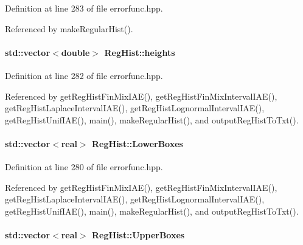 \-Definition at line 283 of file errorfunc.\-hpp.



\-Referenced by make\-Regular\-Hist().

\hypertarget{structRegHist_a587ad6fc6b0ba0a0c723efeafe299189}{
\paragraph[{heights}]{\setlength{\rightskip}{0pt plus 5cm}std\-::vector$<$double$>$ {\bf \-Reg\-Hist\-::heights}}}\label{structRegHist_a587ad6fc6b0ba0a0c723efeafe299189}


\-Definition at line 282 of file errorfunc.\-hpp.



\-Referenced by get\-Reg\-Hist\-Fin\-Mix\-I\-A\-E(), get\-Reg\-Hist\-Fin\-Mix\-Interval\-I\-A\-E(), get\-Reg\-Hist\-Laplace\-Interval\-I\-A\-E(), get\-Reg\-Hist\-Lognormal\-Interval\-I\-A\-E(), get\-Reg\-Hist\-Unif\-I\-A\-E(), main(), make\-Regular\-Hist(), and output\-Reg\-Hist\-To\-Txt().

\hypertarget{structRegHist_ac6b64da4f93f7d21cbdd2c566a7d32bf}{
\paragraph[{\-Lower\-Boxes}]{\setlength{\rightskip}{0pt plus 5cm}std\-::vector$<$real$>$ {\bf \-Reg\-Hist\-::\-Lower\-Boxes}}}\label{structRegHist_ac6b64da4f93f7d21cbdd2c566a7d32bf}


\-Definition at line 280 of file errorfunc.\-hpp.



\-Referenced by get\-Reg\-Hist\-Fin\-Mix\-I\-A\-E(), get\-Reg\-Hist\-Fin\-Mix\-Interval\-I\-A\-E(), get\-Reg\-Hist\-Laplace\-Interval\-I\-A\-E(), get\-Reg\-Hist\-Lognormal\-Interval\-I\-A\-E(), get\-Reg\-Hist\-Unif\-I\-A\-E(), main(), make\-Regular\-Hist(), and output\-Reg\-Hist\-To\-Txt().

\hypertarget{structRegHist_a1336612a62cb90cb7dc2cf2610dc5eee}{
\paragraph[{\-Upper\-Boxes}]{\setlength{\rightskip}{0pt plus 5cm}std\-::vector$<$real$>$ {\bf \-Reg\-Hist\-::\-Upper\-Boxes}}}\label{structRegHist_a1336612a62cb90cb7dc2cf2610dc5eee}


